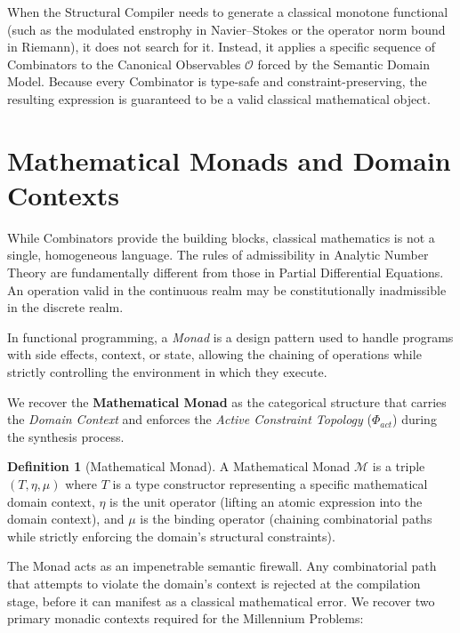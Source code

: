 \documentclass[12pt,openany]{extbook}
\theoremstyle{plain}
\theoremstyle{definition}
\newtheorem{definition}{Definition}[chapter]
\begin{document}
When the Structural Compiler needs to generate a classical monotone functional (such as the modulated enstrophy in Navier--Stokes or the operator norm bound in Riemann), it does not search for it. Instead, it applies a specific sequence of Combinators to the Canonical Observables $\mathcal{O}$ forced by the Semantic Domain Model. Because every Combinator is type-safe and constraint-preserving, the resulting expression is guaranteed to be a valid classical mathematical object.

\section{Mathematical Monads and Domain Contexts}

While Combinators provide the building blocks, classical mathematics is not a single, homogeneous language. The rules of admissibility in Analytic Number Theory are fundamentally different from those in Partial Differential Equations. An operation valid in the continuous realm may be constitutionally inadmissible in the discrete realm.

In functional programming, a \emph{Monad} is a design pattern used to handle programs with side effects, context, or state, allowing the chaining of operations while strictly controlling the environment in which they execute. 

We recover the \textbf{Mathematical Monad} as the categorical structure that carries the \emph{Domain Context} and enforces the \emph{Active Constraint Topology} ($\Phi_{act}$) during the synthesis process.

\begin{definition}[Mathematical Monad]
A Mathematical Monad $\mathcal{M}$ is a triple $(T, \eta, \mu)$ where $T$ is a type constructor representing a specific mathematical domain context, $\eta$ is the unit operator (lifting an atomic expression into the domain context), and $\mu$ is the binding operator (chaining combinatorial paths while strictly enforcing the domain's structural constraints).
\end{definition}

The Monad acts as an impenetrable semantic firewall. Any combinatorial path that attempts to violate the domain's context is rejected at the compilation stage, before it can manifest as a classical mathematical error. We recover two primary monadic contexts required for the Millennium Problems:
\end{document}
